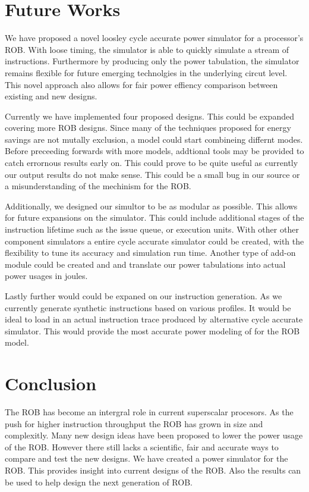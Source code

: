 \section{Future Works}
We have proposed a novel loosley cycle accurate power simulator for a processor's
ROB.  With loose timing, the simulator is able to quickly simulate a stream of
instructions.  Furthermore by producing only the power tabulation, the simulator
remains flexible for future emerging technolgies in the underlying circut level.
This novel approach also allows for fair power effiency comparison between
existing and new designs.

Currently we have implemented four proposed designs.  This could be expanded covering 
more ROB designs. Since many of the techniques proposed for energy savings
are not mutally exclusion, a model could start combineing differnt modes.
Before preceeding forwards with more models, addtional tools may  be provided to
catch errornous results early on.  This could prove to be quite useful as currently
our output results do not make sense.  This could be a small bug in our source or
a misunderstanding of the mechinism for the ROB.

Additionally, we designed our simultor to be as modular as possible.  This allows
for future expansions on the simulator. This could include additional stages of 
the instruction lifetime such as the issue queue, or execution units.  With other
other component simulators a entire cycle accurate simulator could be created, with 
the flexibility to tune its accuracy and simulation run time. Another type of 
add-on module could be created and and translate our power tabulations into actual
power usages in joules.

Lastly further would could be expaned on our instruction generation.  As we 
currently generate synthetic instructions based on various profiles.  It would
be ideal to load in an actual instruction trace produced by alternative cycle 
accurate simulator.  This would provide the most accurate power modeling of for
the ROB model. 

\section{Conclusion}
The ROB has become an intergral role in current superscalar procesors.
As the push for higher instruction throughput the ROB has grown in size
and complexitly.  Many new design ideas have been proposed to lower the
power usage of the ROB.  However there still lacks a scientific, fair and
accurate ways to compare and test the new designs.  We have created a 
power simulator for the ROB.  This provides insight into current designs
of the ROB.  Also the results can be used to help design the next generation
of ROB.  









